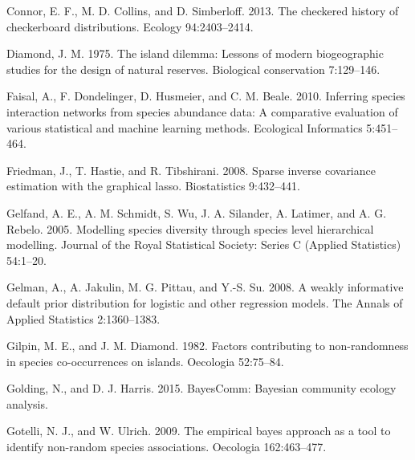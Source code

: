 \documentclass[12pt,]{article}
\begin{document}
\begin{spacing}{1.9}
\begin{flushleft}
Connor, E. F., M. D. Collins, and D. Simberloff. 2013. The checkered
history of checkerboard distributions. Ecology 94:2403--2414.

Diamond, J. M. 1975. The island dilemma: Lessons of modern biogeographic
studies for the design of natural reserves. Biological conservation
7:129--146.

Faisal, A., F. Dondelinger, D. Husmeier, and C. M. Beale. 2010.
Inferring species interaction networks from species abundance data: A
comparative evaluation of various statistical and machine learning
methods. Ecological Informatics 5:451--464.

Friedman, J., T. Hastie, and R. Tibshirani. 2008. Sparse inverse
covariance estimation with the graphical lasso. Biostatistics
9:432--441.

Gelfand, A. E., A. M. Schmidt, S. Wu, J. A. Silander, A. Latimer, and A.
G. Rebelo. 2005. Modelling species diversity through species level
hierarchical modelling. Journal of the Royal Statistical Society: Series
C (Applied Statistics) 54:1--20.

Gelman, A., A. Jakulin, M. G. Pittau, and Y.-S. Su. 2008. A weakly
informative default prior distribution for logistic and other regression
models. The Annals of Applied Statistics 2:1360--1383.

Gilpin, M. E., and J. M. Diamond. 1982. Factors contributing to
non-randomness in species co-occurrences on islands. Oecologia
52:75--84.

Golding, N., and D. J. Harris. 2015. BayesComm: Bayesian community
ecology analysis.

Gotelli, N. J., and W. Ulrich. 2009. The empirical bayes approach as a
tool to identify non-random species associations. Oecologia
162:463--477.


\end{flushleft}
\end{spacing}
\end{document}

